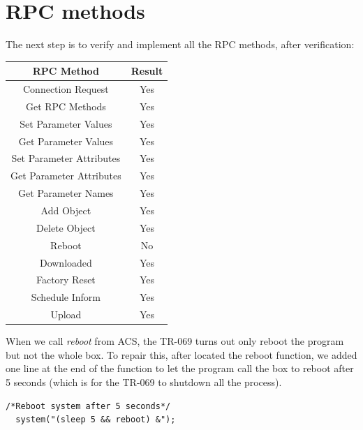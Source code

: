 \section{RPC methods}
The next step is to verify and implement all the RPC methods, after verification:
\begin{center}
  \begin{tabular}{@{} cc @{}}
    \toprule
    RPC Method & Result \\*
    \midrule
    Connection Request & Yes \\
    Get RPC Methods & Yes \\
    Set Parameter Values  & Yes\\
    Get Parameter Values  & Yes\\
    Set Parameter Attributes  & Yes\\
    Get Parameter Attributes  & Yes\\
    Get Parameter Names & Yes\\
    Add Object  & Yes\\
    Delete Object & Yes\\
    Reboot & No\\
    Downloaded  & Yes\\
    Factory Reset & Yes\\
    Schedule Inform & Yes\\
    Upload & Yes\\
    \bottomrule
  \end{tabular}
\end{center}

When we call \textit{reboot} from ACS, the TR-069 turns out only reboot the program but not the whole box. To repair this, after located the reboot function, we added one line at the end of the function to let the program call the box to reboot after 5 seconds (which is for the TR-069 to shutdown all the process).
\begin{lstlisting}[mathescape]
  /*Reboot system after 5 seconds*/
  system("(sleep 5 && reboot) &");
\end{lstlisting}
